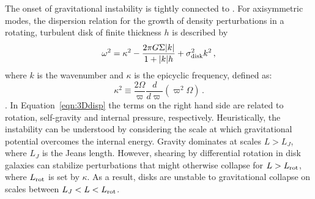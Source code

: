 \IfFileExists{emulateapjlegacy.cls}{\documentclass[iop]{emulateapjlegacy}}{\documentclass[iop]{emulateapj}}
\def\altomega{\varpi}
\begin{document}
The onset of gravitational instability is 
tightly connected to \SF \citep[e.g.,][]{Kennicutt89a, Wang94a, Li05b, Li06a}. 
For axisymmetric modes, the dispersion relation for the growth of density perturbations in a rotating, turbulent disk of finite thickness $h$ is described by
\begin{equation}
\omega^2 = \kappa^2 - \frac{2\pi G \Sigma |k|}{1 + |k| h} + \sigma_{\rm disk}^2 k^2\,,
\label{eqn:3Ddisp}
\end{equation}
where $k$ is the wavenumber and $\kappa$ is the epicyclic frequency, defined as:
\begin{equation}
\kappa^2\equiv\frac{2\Omega}{\altomega}\frac{d}{d\altomega}\left(\altomega^2\Omega\right)\,.
\label{eqn:kappa}
\end{equation}
\citep{Romeo92a}.
In Equation~\ref{eqn:3Ddisp} the terms on the right hand side are related to rotation, self-gravity and internal pressure, respectively. 
    Heuristically, the instability can be understood by considering the scale
 at which gravitational potential overcomes the internal energy. Gravity dominates at scales $L > L_J$, where $L_J$ is the Jeans length. However, 
   shearing by 
differential rotation in disk galaxies can stabilize perturbations 
    that might otherwise collapse for $L > L_{\rm rot}$, where $L_{\rm rot}$ is set by $\kappa$.
    As a result, disks are unstable to gravitational collapse on 
scales between $L_J < L < L_{\rm rot}$.  
\end{document}
